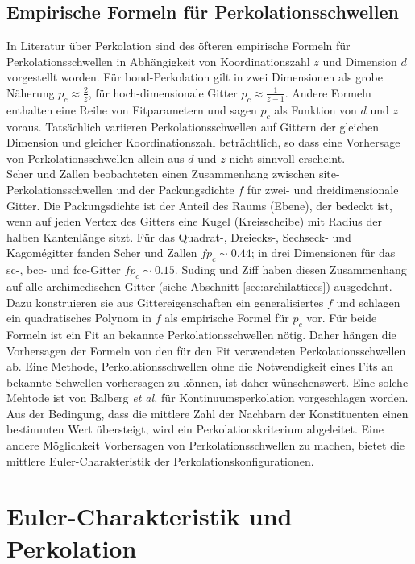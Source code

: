 \subsection{Empirische Formeln f\"ur Perkolationsschwellen}
In Literatur \"uber Perkolation sind des \"ofteren empirische Formeln f\"ur Perkolationsschwellen in Abh\"angigkeit von Koordinationszahl $z$ und Dimension $d$ vorgestellt worden. F\"ur bond-Perkolation gilt in zwei Dimensionen als grobe N\"aherung $p_c\approx \frac{2}{z}$, f\"ur hoch-dimensionale Gitter $p_c \approx \frac{1}{z-1}$. Andere Formeln enthalten eine Reihe von Fitparametern und sagen $p_c$ als Funktion von $d$ und $z$ voraus. Tats\"achlich variieren Perkolationsschwellen auf Gittern der gleichen Dimension und gleicher Koordinationszahl betr\"achtlich, so dass eine Vorhersage von Perkolationsschwellen allein aus $d$ und $z$ nicht sinnvoll erscheint. \\
Scher und Zallen \cite{Scher:70} beobachteten einen Zusammenhang zwischen site-Perkolationsschwel\-len und der Packungsdichte $f$ f\"ur zwei- und dreidimensionale Gitter. Die Packungsdichte ist der Anteil des Raums (Ebene), der bedeckt ist, wenn auf jeden Vertex des Gitters eine Kugel (Kreisscheibe) mit Radius der halben Kantenl\"ange sitzt. F\"ur das \mbox{Quadrat-,} \mbox{Dreiecks-,} Sechseck- und Kagom\'egitter fanden Scher und Zallen $fp_c \sim 0.44$; in drei Dimensionen f\"ur das sc-, bcc- und fcc-Gitter $fp_c \sim 0.15$. Suding und Ziff \cite{Suding:99} haben diesen Zusammenhang auf alle archimedischen Gitter (siehe Abschnitt \ref{sec:archilattices}) ausgedehnt. Dazu konstruieren sie aus Gittereigenschaften ein generalisiertes $f$ und schlagen ein quadratisches Polynom in $f$ als empirische Formel f\"ur $p_c$ vor. F\"ur beide Formeln ist ein Fit an bekannte Perkolationsschwellen n\"otig. Daher h\"angen die Vorhersagen der Formeln von den f\"ur den Fit verwendeten Perkolationsschwellen ab. Eine Methode, Perkolationsschwellen ohne die Notwendigkeit eines Fits an bekannte Schwellen vorhersagen zu k\"onnen, ist daher w\"unschenswert. Eine solche Mehtode ist von Balberg \textit{et al.} \cite{Balberg:91} f\"ur Kontinuumsperkolation vorgeschlagen worden. Aus der Bedingung, dass die mittlere Zahl der Nachbarn der Konstituenten einen bestimmten Wert \"ubersteigt, wird ein Perkolationskriterium abgeleitet. Eine andere M\"oglichkeit Vorhersagen von Perkolationsschwellen zu machen, bietet die mittlere Euler-Charakteristik  der Perkolationskonfigurationen.   

\section{Euler-Charakteristik und Perkolation}

